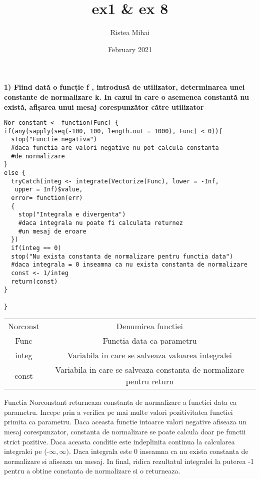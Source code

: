 \documentclass[12pt, twoside]{article}
\title{ex1 & ex 8}
\author{Ristea Mihai}
\date{February 2021}
\begin{document}
	
\textbf{1) Fiind dată o funcție f , introdusă de utilizator, determinarea unei constante de
	normalizare k. In cazul in care o asemenea constantă nu există, afișarea unui mesaj
	corespunzător către utilizator}\vspace{5mm}

\begin{lstlisting}
Nor_constant <- function(Func) {
if(any(sapply(seq(-100, 100, length.out = 1000), Func) < 0)){
  stop("Functie negativa")
  #daca functia are valori negative nu pot calcula constanta
  #de normalizare
}
else {
  tryCatch(integ <- integrate(Vectorize(Func), lower = -Inf,
   upper = Inf)$value,
  error= function(err)
  {
    stop("Integrala e divergenta")
    #daca integrala nu poate fi calculata returnez
    #un mesaj de eroare
  })
  if(integ == 0)
  stop("Nu exista constanta de normalizare pentru functia data")
  #daca integrala = 0 inseamna ca nu exista constanta de normalizare
  const <- 1/integ
  return(const)
}
	
}
\end{lstlisting}

\begin{center}
	\begin{tabular}{ c c }
		Nor\underline{\hspace{.08in}}const & Denumirea functiei \\
		Func & Functia data ca parametru \\
		integ & Variabila in care se salveaza valoarea integralei \\
		const & Variabila in care se salveaza constanta de normalizare pentru return
	\end{tabular}
\end{center}
\vspace{30mm}

	Functia Nor\underline{\hspace{.08in}}constant returneaza constanta de normalizare a functiei data ca parametru.\hfill \break
	\indent Incepe prin a verifica pe mai multe valori pozitivitatea functiei primita ca parametru. Daca aceasta functie intoarce valori negative afiseaza un mesaj corespunzator, constanta de normalizare se poate calcula doar pe functii strict pozitive.\hfill \break
	\indent Daca aceasta conditie este indeplinita continua la calcularea integralei pe (-$\infty, \infty$$ )$. Daca integrala este 0 inseamna ca nu exista constanta de normalizare si afiseaza un mesaj. \hfill \break
	\indent In final, ridica rezultatul integralei la puterea -1 pentru a obtine constanta de normalizare si o returneaza.
\end{document}

